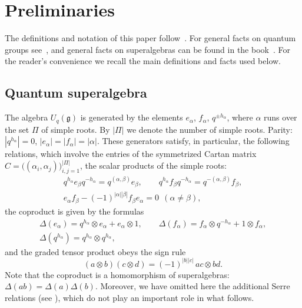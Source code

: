 \documentclass[12pt,a4paper]{article}
\newcommand{\g}{\mathfrak{g}}
\newcommand{\Uq}{U_q}
\newcommand{\ot}{\otimes}
\begin{document}

\section{Preliminaries}
The definitions and notation of this paper follow~\cite{AMS}. For general facts on quantum groups see~\cite{KS}, and general facts on superalgebras can be found in the book~\cite{CW}. For the reader's convenience we recall the main definitions and facts used below.

\subsection{Quantum superalgebra}
The algebra $\Uq(\g)$ is generated by the elements $e_\alpha$, $f_\alpha$, $q^{\pm h_\alpha}$, where $\alpha$ runs over the set $\Pi$ of simple roots. By $|\Pi|$ we denote the number of simple roots.
Parity: $|q^{h_\alpha}|=0$, $|e_\alpha|=|f_\alpha|=|\alpha|$. These generators satisfy, in particular, the following relations, which involve the entries of the symmetrized Cartan matrix $C=\bigl((\alpha_i,\alpha_j)\bigr)_{i,j=1}^{|\Pi|}$, the scalar products of the simple roots:
\begin{equation}
\begin{gathered}
q^{h_\alpha}e_\beta q^{-h_\alpha}=q^{(\alpha,\beta)}e_\beta,\qquad
q^{h_\alpha}f_\beta q^{-h_\alpha}=q^{-(\alpha,\beta)}f_\beta,\\
e_\alpha f_\beta-(-1)^{|\alpha||\beta|}f_\beta e_\alpha=0\ \ (\alpha\neq\beta),
\end{gathered}
\end{equation}
the coproduct is given by the formulas
\begin{equation}\label{eq:cop}
\begin{gathered}
\Delta(e_\alpha)=q^{h_\alpha}\ot e_\alpha+e_\alpha\ot1,\qquad
\Delta(f_\alpha)=f_\alpha\ot q^{-h_\alpha}+1\ot f_\alpha,\\
\Delta(q^{h_\alpha})=q^{h_\alpha}\ot q^{h_\alpha},
\end{gathered}
\end{equation}
and the graded tensor product obeys the sign rule
\begin{equation}\label{eq:koszul}
(a\ot b)(c\ot d)=(-1)^{|b||c|}\,ac\ot bd .
\end{equation}
Note that the coproduct is a homomorphism of superalgebras: $\Delta(ab)=\Delta(a)\Delta(b)$. Moreover, we have omitted here the additional Serre relations (see \cite{Y}), which do not play an important role in what follows.
\end{document}
